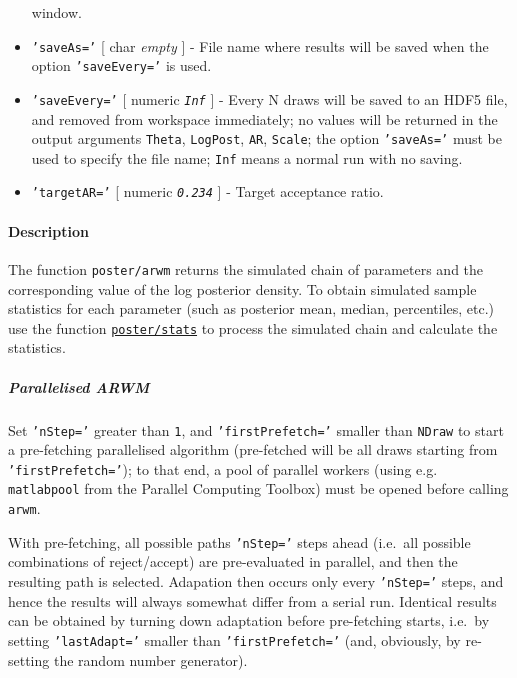 \begin{itemize}
  window.
\item
  \texttt{'saveAs='} {[} char \textbar{} \emph{empty} {]} - File name
  where results will be saved when the option \texttt{'saveEvery='} is
  used.
\item
  \texttt{'saveEvery='} {[} numeric \textbar{} \emph{\texttt{Inf}} {]} -
  Every N draws will be saved to an HDF5 file, and removed from
  workspace immediately; no values will be returned in the output
  arguments \texttt{Theta}, \texttt{LogPost}, \texttt{AR},
  \texttt{Scale}; the option \texttt{'saveAs='} must be used to specify
  the file name; \texttt{Inf} means a normal run with no saving.
\item
  \texttt{'targetAR='} {[} numeric \textbar{} \emph{\texttt{0.234}} {]}
  - Target acceptance ratio.
\end{itemize}

\paragraph{Description}\label{description}

The function \texttt{poster/arwm} returns the simulated chain of
parameters and the corresponding value of the log posterior density. To
obtain simulated sample statistics for each parameter (such as posterior
mean, median, percentiles, etc.) use the function
\href{poster/stats}{\texttt{poster/stats}} to process the simulated
chain and calculate the statistics.

\subparagraph{Parallelised ARWM}\label{parallelised-arwm}

Set \texttt{'nStep='} greater than \texttt{1}, and
\texttt{'firstPrefetch='} smaller than \texttt{NDraw} to start a
pre-fetching parallelised algorithm (pre-fetched will be all draws
starting from \texttt{'firstPrefetch='}); to that end, a pool of
parallel workers (using e.g. \texttt{matlabpool} from the Parallel
Computing Toolbox) must be opened before calling \texttt{arwm}.

With pre-fetching, all possible paths \texttt{'nStep='} steps ahead
(i.e.~all possible combinations of reject/accept) are pre-evaluated in
parallel, and then the resulting path is selected. Adapation then occurs
only every \texttt{'nStep='} steps, and hence the results will always
somewhat differ from a serial run. Identical results can be obtained by
turning down adaptation before pre-fetching starts, i.e.~by setting
\texttt{'lastAdapt='} smaller than \texttt{'firstPrefetch='} (and,
obviously, by re-setting the random number generator).

